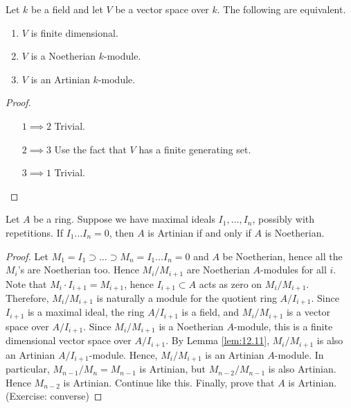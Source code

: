 \pagebreak


\begin{lemma}
\label{lem:12.11}
Let $ k $ be a field and let $ V $ be a vector space over $ k $. The following are equivalent.
\begin{enumerate}
\item $ V $ is finite dimensional.
\item $ V $ is a Noetherian $ k $-module.
\item $ V $ is an Artinian $ k $-module.
\end{enumerate}
\end{lemma}

\begin{proof}
\hfill
\begin{itemize}[leftmargin=0.5in]
\item[$ 1 \implies 2 $] Trivial.
\item[$ 2 \implies 3 $] Use the fact that $ V $ has a finite generating set.
\item[$ 3 \implies 1 $] Trivial.
\end{itemize}
\end{proof}

\begin{lemma}
\label{lem:12.12}
Let $ A $ be a ring. Suppose we have maximal ideals $ I_1, \dots, I_n $, possibly with repetitions. If $ I_1 \dots I_n = 0 $, then $ A $ is Artinian if and only if $ A $ is Noetherian.
\end{lemma}

\begin{proof}
Let $ M_1 = I_1 \supset \dots \supset M_n = I_1 \dots I_n = 0 $ and $ A $ be Noetherian, hence all the $ M_i $'s are Noetherian too. Hence $ M_i / M_{i + 1} $ are Noetherian $ A $-modules for all $ i $. Note that $ M_i \cdot I_{i + 1} = M_{i + 1} $, hence $ I_{i + 1} \subset A $ acts as zero on $ M_i / M_{i + 1} $. Therefore, $ M_i / M_{i + 1} $ is naturally a module for the quotient ring $ A / I_{i + 1} $. Since $ I_{i + 1} $ is a maximal ideal, the ring $ A / I_{i + 1} $ is a field, and $ M_i / M_{i + 1} $ is a vector space over $ A / I_{i + 1} $. Since $ M_i / M_{i + 1} $ is a Noetherian $ A $-module, this is a finite dimensional vector space over $ A / I_{i + 1} $. By Lemma \ref{lem:12.11}, $ M_i / M_{i + 1} $ is also an Artinian $ A / I_{i + 1} $-module. Hence, $ M_i / M_{i + 1} $ is an Artinian $ A $-module. In particular, $ M_{n - 1} / M_n = M_{n - 1} $ is Artinian, but $ M_{n - 2} / M_{n - 1} $ is also Artinian. Hence $ M_{n - 2} $ is Artinian. Continue like this. Finally, prove that $ A $ is Artinian. (Exercise: converse)
\end{proof}

